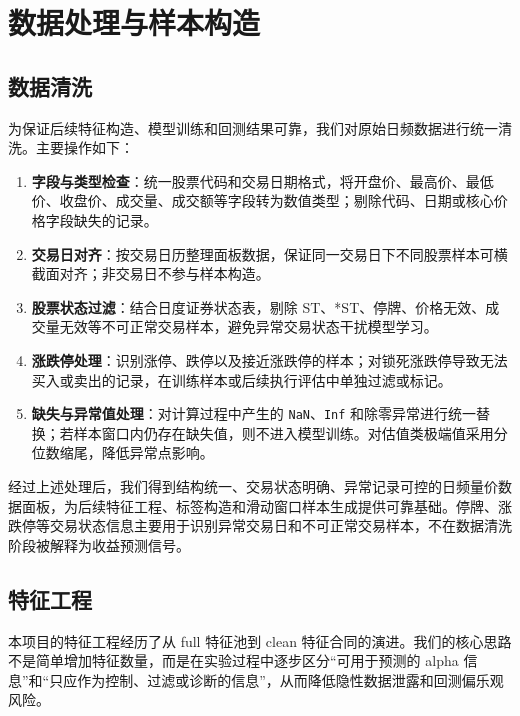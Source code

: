\documentclass[12pt,a4paper,cn,bibtex]{elegantpaper}
\begin{document}
\section{数据处理与样本构造}
\subsection{数据清洗}

为保证后续特征构造、模型训练和回测结果可靠，我们对原始日频数据进行统一清洗。主要操作如下：

\begin{enumerate}
    \item \textbf{字段与类型检查}：统一股票代码和交易日期格式，将开盘价、最高价、最低价、收盘价、成交量、成交额等字段转为数值类型；剔除代码、日期或核心价格字段缺失的记录。
    \item \textbf{交易日对齐}：按交易日历整理面板数据，保证同一交易日下不同股票样本可横截面对齐；非交易日不参与样本构造。
    \item \textbf{股票状态过滤}：结合日度证券状态表，剔除 ST、*ST、停牌、价格无效、成交量无效等不可正常交易样本，避免异常交易状态干扰模型学习。
    \item \textbf{涨跌停处理}：识别涨停、跌停以及接近涨跌停的样本；对锁死涨跌停导致无法买入或卖出的记录，在训练样本或后续执行评估中单独过滤或标记。
    \item \textbf{缺失与异常值处理}：对计算过程中产生的 \texttt{NaN}、\texttt{Inf} 和除零异常进行统一替换；若样本窗口内仍存在缺失值，则不进入模型训练。对估值类极端值采用分位数缩尾，降低异常点影响。
\end{enumerate}

经过上述处理后，我们得到结构统一、交易状态明确、异常记录可控的日频量价数据面板，为后续特征工程、标签构造和滑动窗口样本生成提供可靠基础。停牌、涨跌停等交易状态信息主要用于识别异常交易日和不可正常交易样本，不在数据清洗阶段被解释为收益预测信号。

\subsection{特征工程}

本项目的特征工程经历了从 full 特征池到 clean 特征合同的演进。我们的核心思路不是简单增加特征数量，而是在实验过程中逐步区分“可用于预测的 alpha 信息”和“只应作为控制、过滤或诊断的信息”，从而降低隐性数据泄露和回测偏乐观风险。
\end{document}

